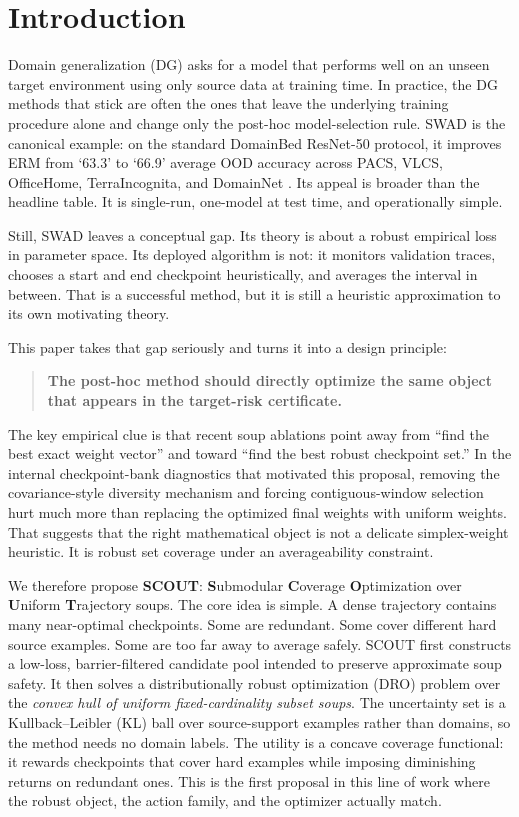 \documentclass{article}
\newcommand{\ood}{OOD}
\newcommand{\scout}{\textup{\textsc{SCOUT}}}
\newcommand{\swad}{\textup{\textsc{SWAD}}}
\begin{document}
\section{Introduction}

Domain generalization (DG) asks for a model that performs well on an unseen target environment using only source data at training time. In practice, the DG methods that stick are often the ones that leave the underlying training procedure alone and change only the post-hoc model-selection rule. \swad{} is the canonical example: on the standard DomainBed ResNet-50 protocol, it improves ERM from `63.3' to `66.9' average \ood{} accuracy across PACS, VLCS, OfficeHome, TerraIncognita, and DomainNet \citep{cha2021swad}. Its appeal is broader than the headline table. It is single-run, one-model at test time, and operationally simple.

Still, \swad{} leaves a conceptual gap. Its theory is about a robust empirical loss in parameter space. Its deployed algorithm is not: it monitors validation traces, chooses a start and end checkpoint heuristically, and averages the interval in between. That is a successful method, but it is still a heuristic approximation to its own motivating theory.

This paper takes that gap seriously and turns it into a design principle:
\begin{quote}
\textbf{The post-hoc method should directly optimize the same object that appears in the target-risk certificate.}
\end{quote}

The key empirical clue is that recent soup ablations point away from ``find the best exact weight vector'' and toward ``find the best robust checkpoint set.'' In the internal checkpoint-bank diagnostics that motivated this proposal, removing the covariance-style diversity mechanism and forcing contiguous-window selection hurt much more than replacing the optimized final weights with uniform weights. That suggests that the right mathematical object is not a delicate simplex-weight heuristic. It is robust set coverage under an averageability constraint.

We therefore propose \textbf{\scout{}}: \textbf{S}ubmodular \textbf{C}overage \textbf{O}ptimization over \textbf{U}niform \textbf{T}rajectory soups. The core idea is simple. A dense trajectory contains many near-optimal checkpoints. Some are redundant. Some cover different hard source examples. Some are too far away to average safely. \scout{} first constructs a low-loss, barrier-filtered candidate pool intended to preserve approximate soup safety. It then solves a distributionally robust optimization (DRO) problem over the \emph{convex hull of uniform fixed-cardinality subset soups}. The uncertainty set is a Kullback--Leibler (KL) ball over source-support examples rather than domains, so the method needs no domain labels. The utility is a concave coverage functional: it rewards checkpoints that cover hard examples while imposing diminishing returns on redundant ones. This is the first proposal in this line of work where the robust object, the action family, and the optimizer actually match.
\end{document}

